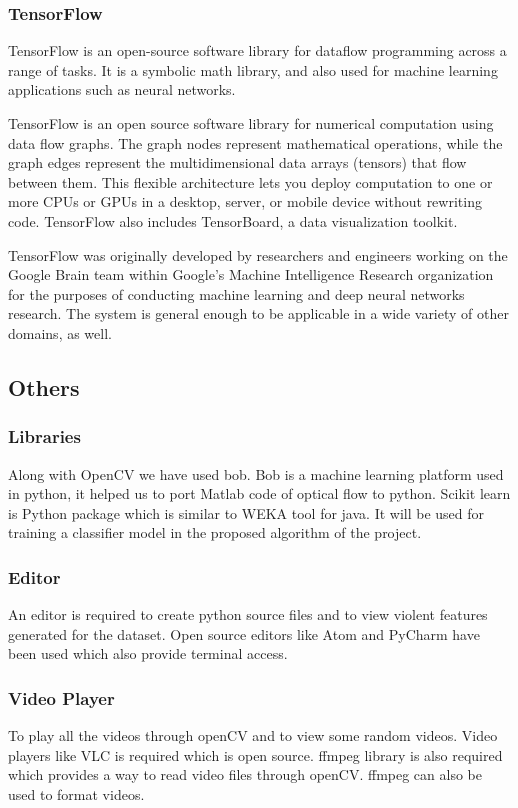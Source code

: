 \subsubsection{TensorFlow}
TensorFlow is an open-source software library for dataflow programming across a range of tasks. It is a symbolic math library, and also used for machine learning applications such as neural networks.
\par
TensorFlow is an open source software library for numerical computation using data flow graphs. The graph nodes represent mathematical operations, while the graph edges represent the multidimensional data arrays (tensors) that flow between them. This flexible architecture lets you deploy computation to one or more CPUs or GPUs in a desktop, server, or mobile device without rewriting code. TensorFlow also includes TensorBoard, a data visualization toolkit.
\par
TensorFlow was originally developed by researchers and engineers working on the Google Brain team within Google's Machine Intelligence Research organization for the purposes of conducting machine learning and deep neural networks research. The system is general enough to be applicable in a wide variety of other domains, as well.
\subsection{Others}
\subsubsection{Libraries}
Along with OpenCV we have used bob. Bob is a machine learning platform used in python, it helped us to port Matlab code of optical flow to python. Scikit learn is Python package which is similar to WEKA tool for java. It will be used for training a classifier model in the proposed algorithm of the project.

\subsubsection{Editor}
An editor is required to create python source files and to view violent features generated for the dataset. Open source editors like Atom and PyCharm have been used which also provide terminal access.

\subsubsection{Video Player}
To play all the videos through openCV and to view some random videos. Video players like VLC is required which is open source. ffmpeg library is also required which provides a way to read video files through openCV. ffmpeg can also be used to format videos.


